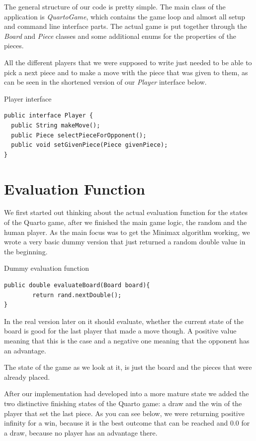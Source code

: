 \documentclass{scrartcl}
\begin{document}
The general structure of our code is pretty simple. The main class of the application is \textit{QuartoGame}, which contains the game loop and almost all setup and command line interface parts. The actual game is put together through the \textit{Board} and \textit{Piece} classes and some additional enums for the properties of the pieces.

All the different players that we were supposed to write just needed to be able to pick a next piece and to make a move with the piece that was given to them, as can be seen in the shortened version of our \textit{Player} interface below.

\begin{listing}[H]
\caption{Player interface}
\begin{verbatim}
public interface Player {
  public String makeMove();
  public Piece selectPieceForOpponent();
  public void setGivenPiece(Piece givenPiece);
}
\end{verbatim}
\end{listing}

\section{Evaluation Function}

We first started out thinking about the actual evaluation function for the states of the Quarto game, after we finished the main game logic, the random and the human player. As the main focus was to get the Minimax algorithm working, we wrote a very basic dummy version that just returned a random double value in the beginning.

\begin{listing}[H]
\caption{Dummy evaluation function}
\begin{verbatim}
public double evaluateBoard(Board board){
        return rand.nextDouble();
}
\end{verbatim}
\end{listing}

In the real version later on it should evaluate, whether the current state of the board is good for the last player that made a move though. A positive value meaning that this is the case and a negative one meaning that the opponent has an advantage.

The state of the game as we look at it, is just the board and the pieces that were already placed.

After our implementation had developed into a more mature state we added the two distinctive finishing states of the Quarto game: a draw and the win of the player that set the last piece. As you can see below, we were returning positive infinity for a win, because it is the best outcome that can be reached and 0.0 for a draw, because no player has an advantage there.
\end{document}
